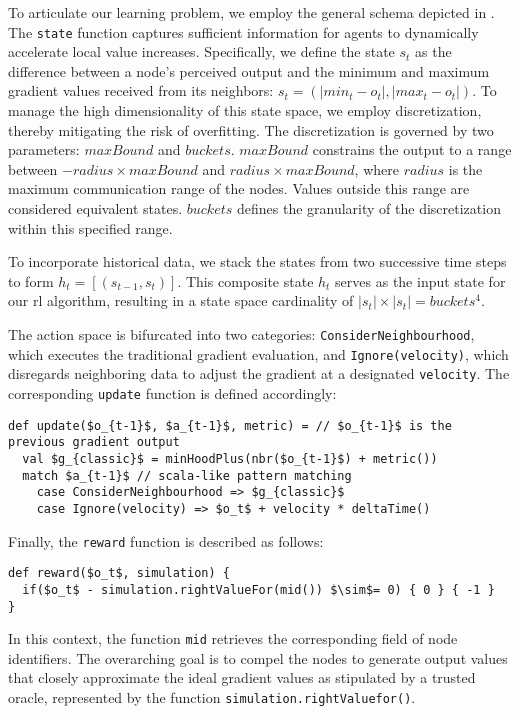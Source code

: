 To articulate our learning problem, 
 we employ the general schema depicted in . 
 The \lstinline|state| function captures sufficient information for agents to dynamically accelerate local value increases. 
 Specifically, we define the state \( s_t \) as the difference between a node's perceived output and the minimum and maximum gradient values received from its neighbors: \( s_t = (|min_t - o_t|, |max_t - o_t|) \). 
 To manage the high dimensionality of this state space, we employ discretization, thereby mitigating the risk of overfitting. 
 The discretization is governed by two parameters: 
 \( maxBound \) and \( buckets \). 
 \( maxBound \) constrains the output to a range between \( - radius \times maxBound \) and \( radius \times maxBound \), where \( radius \) is the maximum communication range of the nodes. 
 Values outside this range are considered equivalent states. 
 \( buckets \) defines the granularity of the discretization within this specified range.

To incorporate historical data, 
 we stack the states from two successive time steps to form \( h_t = [(s_{t - 1}, s_t)] \). 
 This composite state \( h_t \) serves as the input state for our \ac{rl} algorithm, 
 resulting in a state space cardinality of \( |s_t| \times |s_t| = buckets^4 \).

The action space is bifurcated into two categories: 
 \texttt{ConsiderNeighbourhood}, 
 which executes the traditional gradient evaluation, and \texttt{Ignore(velocity)}, 
 which disregards neighboring data to adjust the gradient at a designated \texttt{velocity}. 
 The corresponding \texttt{update} function is defined accordingly:
\begin{lstlisting}[mathescape]
def update($o_{t-1}$, $a_{t-1}$, metric) = // $o_{t-1}$ is the previous gradient output
  val $g_{classic}$ = minHoodPlus(nbr($o_{t-1}$) + metric())
  match $a_{t-1}$ // scala-like pattern matching
    case ConsiderNeighbourhood => $g_{classic}$
    case Ignore(velocity) => $o_t$ + velocity * deltaTime() 
\end{lstlisting}
%
Finally, the \texttt{reward} function is described as follows: 
\begin{lstlisting}[mathescape]
def reward($o_t$, simulation) {
  if($o_t$ - simulation.rightValueFor(mid()) $\sim$= 0) { 0 } { -1 }
}
\end{lstlisting}
In this context, the function \lstinline|mid| retrieves the corresponding field of node identifiers. 
 The overarching goal is to compel the nodes to generate output values that closely approximate the ideal gradient values as stipulated by a trusted oracle, represented by the function \lstinline|simulation.rightValuefor()|.

